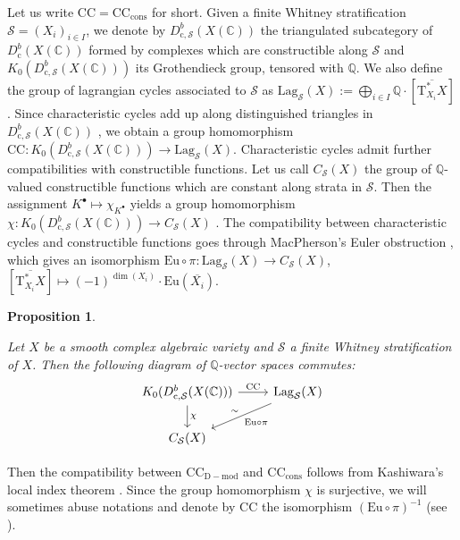 \documentclass[11pt,english]{article}
\numberwithin{equation}{section}
\numberwithin{figure}{section}
\theoremstyle{definition}
\theoremstyle{plain}
\newtheorem{prop}[df]{Proposition}
\theoremstyle{remark}
\newcommand\QQ{\mathbb{Q}}
\newcommand\CC{\mathbb{C}}
\begin{document}
Let us write $\mathrm{CC}=\mathrm{CC}_{\mathrm{cons}}$ for short.
Given a finite Whitney stratification $\mathcal{S}=(X_{i})_{i\in I}$,
we denote by $D_{\mathrm{c},\mathcal{S}}^{b}(X(\CC))$ the triangulated
subcategory of $D_{\mathrm{c}}^{b}(X(\CC))$ formed by complexes which
are constructible along $\mathcal{S}$ and $K_{0}(D_{\mathrm{c},\mathcal{S}}^{b}(X(\CC)))$
its Grothendieck group, tensored with $\QQ$. We also define the group
of lagrangian cycles associated to $\mathcal{S}$ as $\mathrm{Lag}_{\mathcal{S}}(X):=\bigoplus_{i\in I}\QQ\cdot[\overline{\mathrm{T}_{X_{i}}^{*}X}]$.
Since characteristic cycles add up along distinguished triangles in
$D_{\mathrm{c},\mathcal{S}}^{b}(X(\CC))$ \cite[Cor. 4.3.22.]{Dim04},
we obtain a group homomorphism $\mathrm{CC}:K_{0}(D_{\mathrm{c},\mathcal{S}}^{b}(X(\CC)))\rightarrow\mathrm{Lag}_{\mathcal{S}}(X)$.
Characteristic cycles admit further compatibilities with constructible
functions. Let us call $C_{\mathcal{S}}(X)$ the group of $\QQ$-valued
constructible functions which are constant along strata in $\mathcal{S}$.
Then the assignment $K^{\bullet}\mapsto\chi_{K^{\bullet}}$ yields
a group homomorphism $\chi:K_{0}(D_{\mathrm{c},\mathcal{S}}^{b}(X(\CC)))\rightarrow C_{\mathcal{S}}(X)$
\cite[\S 4.1.]{Dim04}. The compatibility between characteristic cycles
and constructible functions goes through MacPherson's Euler obstruction
\cite[\S 3.]{Mac74}, which gives an isomorphism $\mathrm{Eu}\circ\pi:\mathrm{Lag}_{\mathcal{S}}(X)\rightarrow C_{\mathcal{S}}(X)$,
$[\overline{\mathrm{T}_{X_{i}}^{*}X}]\mapsto(-1)^{\dim(X_{i})}\cdot\mathrm{Eu}(\overline{X_{i}})$.

\begin{prop}{\cite[Thm. 4.3.25.]{Dim04}}

Let $X$ be a smooth complex algebraic variety and $\mathcal{S}$
a finite Whitney stratification of $X$. Then the following diagram
of $\QQ$-vector spaces commutes:\[
\begin{tikzcd}[ampersand replacement=\&]
K_{0}(D_{\mathrm{c},\mathcal{S}}^{b}(X(\CC))) \ar[d,"\chi"]\ar[r,"\mathrm{CC}"] \& \mathrm{Lag}_{\mathcal{S}}(X) \ar[dl,"\mathrm{Eu}\circ\pi", rotate=-45,"\sim"'] \\
C_{\mathcal{S}}(X) \& 
\end{tikzcd}
\]\end{prop}

Then the compatibility between $\mathrm{CC}_{\mathrm{D-mod}}$ and
$\mathrm{CC}_{\mathrm{cons}}$ follows from Kashiwara's local index
theorem \cite[Thm. 4.6.7.]{HTT08}. Since the group homomorphism $\chi$
is surjective, we will sometimes abuse notations and denote by $\mathrm{CC}$
the isomorphism $(\mathrm{Eu}\circ\pi)^{-1}$ (see \cite[Rmk. 4.3.27.]{Dim04}).
\end{document}
